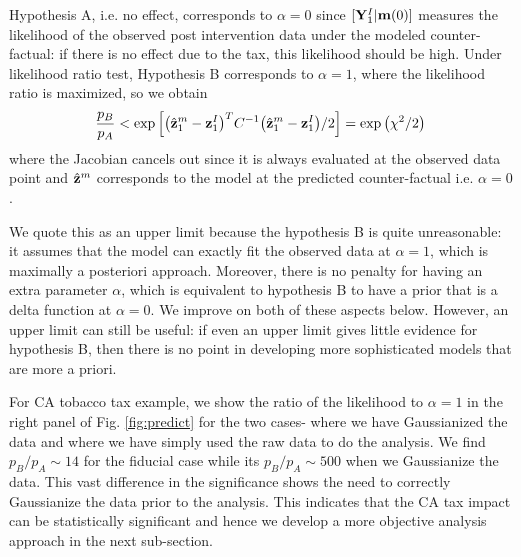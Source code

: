 \documentclass{article}
\def\bm{{\bf m}}
\def\bY{{\bf Y}}
\def\bz{{\bf z}}
\begin{document}
Hypothesis A, i.e. no effect, corresponds to $\alpha=0$ since $[\bY^I_{1}|\bm(0)]$ measures the likelihood of the observed post intervention data under the modeled counter-factual: if there is no effect due to the tax, this likelihood should be high.
Under likelihood ratio test, Hypothesis B corresponds to $\alpha=1$, where the likelihood ratio is maximized, so we obtain
\begin{equation}
\frac{p_B}{p_A}<
    \exp\left[\big(\hat \bz^m_{1} - \bz^I_{1}\big)^T C^{-1} \big(\hat \bz^m_{1} - \bz^I_{1}\big)/2\right] = \exp\left(\chi^2/2\right)
    \label{upper}
\end{equation}
where the Jacobian cancels out since it is always evaluated at the observed data point and $\hat \bz^m$ corresponds to the model at the predicted counter-factual i.e. $\alpha=0$.

We quote this as an upper limit because the hypothesis B is quite unreasonable: it assumes that the 
model can exactly fit the observed data at $\alpha=1$, which is maximally a posteriori approach. Moreover, there is no penalty for 
having an extra parameter $\alpha$, which is equivalent to hypothesis B to have a prior that is a 
delta function at $\alpha=0$. We improve on both 
of these aspects below. However, an upper limit can still be useful: 
if even an upper limit gives little evidence for hypothesis 
B, then there is no point in developing more 
sophisticated models that are more a priori. 

For CA tobacco tax example, we show the ratio of the likelihood to $\alpha=1$ in the right panel of Fig. \ref{fig:predict} for the two cases- where we have Gaussianized the data and where we have simply used the raw data to do the analysis. We find $p_B/p_A\sim14$ for the fiducial case while its $p_B/p_A\sim500$ when we Gaussianize the data. This vast difference in the significance shows the need to correctly Gaussianize the data prior to the analysis. This indicates that the CA tax impact can be statistically significant and hence we develop a more objective analysis approach in the next sub-section. 

\end{document}
